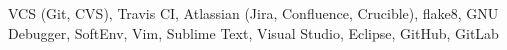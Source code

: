
    \item [Software:] VCS (Git, CVS), Travis CI, Atlassian (Jira, Confluence, Crucible), flake8, GNU Debugger, SoftEnv, Vim, Sublime Text, Visual Studio, Eclipse, GitHub, GitLab
